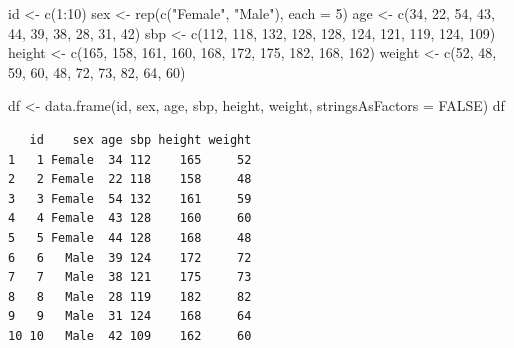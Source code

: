 \documentclass[
  11pt,
]{krantz}
\newenvironment{Shaded}{\begin{snugshade}}{\end{snugshade}}
\newcommand{\AttributeTok}[1]{\textcolor[rgb]{0.61,0.61,0.61}{#1}}
\newcommand{\ConstantTok}[1]{\textcolor[rgb]{0,0,0}{#1}}
\newcommand{\DecValTok}[1]{\textcolor[rgb]{0.06,0.06,0.06}{#1}}
\newcommand{\FunctionTok}[1]{\textcolor[rgb]{0,0,0}{#1}}
\newcommand{\NormalTok}[1]{#1}
\newcommand{\OtherTok}[1]{\textcolor[rgb]{0.37,0.37,0.37}{#1}}
\newcommand{\SpecialCharTok}[1]{\textcolor[rgb]{0,0,0}{#1}}
\newcommand{\StringTok}[1]{\textcolor[rgb]{0.5,0.5,0.5}{#1}}
\begin{document}
\begin{Shaded}
\begin{Highlighting}[]
\NormalTok{id }\OtherTok{\textless{}{-}} \FunctionTok{c}\NormalTok{(}\DecValTok{1}\SpecialCharTok{:}\DecValTok{10}\NormalTok{)}
\NormalTok{sex }\OtherTok{\textless{}{-}} \FunctionTok{rep}\NormalTok{(}\FunctionTok{c}\NormalTok{(}\StringTok{"Female"}\NormalTok{, }\StringTok{"Male"}\NormalTok{), }\AttributeTok{each =} \DecValTok{5}\NormalTok{)}
\NormalTok{age }\OtherTok{\textless{}{-}} \FunctionTok{c}\NormalTok{(}\DecValTok{34}\NormalTok{, }\DecValTok{22}\NormalTok{, }\DecValTok{54}\NormalTok{, }\DecValTok{43}\NormalTok{, }\DecValTok{44}\NormalTok{, }\DecValTok{39}\NormalTok{, }\DecValTok{38}\NormalTok{, }\DecValTok{28}\NormalTok{, }\DecValTok{31}\NormalTok{, }\DecValTok{42}\NormalTok{)}
\NormalTok{sbp }\OtherTok{\textless{}{-}} \FunctionTok{c}\NormalTok{(}\DecValTok{112}\NormalTok{, }\DecValTok{118}\NormalTok{, }\DecValTok{132}\NormalTok{, }\DecValTok{128}\NormalTok{, }\DecValTok{128}\NormalTok{, }\DecValTok{124}\NormalTok{, }\DecValTok{121}\NormalTok{, }\DecValTok{119}\NormalTok{, }\DecValTok{124}\NormalTok{, }\DecValTok{109}\NormalTok{)}
\NormalTok{height }\OtherTok{\textless{}{-}} \FunctionTok{c}\NormalTok{(}\DecValTok{165}\NormalTok{, }\DecValTok{158}\NormalTok{, }\DecValTok{161}\NormalTok{, }\DecValTok{160}\NormalTok{, }\DecValTok{168}\NormalTok{, }\DecValTok{172}\NormalTok{, }\DecValTok{175}\NormalTok{, }\DecValTok{182}\NormalTok{, }\DecValTok{168}\NormalTok{, }\DecValTok{162}\NormalTok{)}
\NormalTok{weight }\OtherTok{\textless{}{-}} \FunctionTok{c}\NormalTok{(}\DecValTok{52}\NormalTok{, }\DecValTok{48}\NormalTok{, }\DecValTok{59}\NormalTok{, }\DecValTok{60}\NormalTok{, }\DecValTok{48}\NormalTok{, }\DecValTok{72}\NormalTok{, }\DecValTok{73}\NormalTok{, }\DecValTok{82}\NormalTok{, }\DecValTok{64}\NormalTok{, }\DecValTok{60}\NormalTok{)}

\NormalTok{df }\OtherTok{\textless{}{-}} \FunctionTok{data.frame}\NormalTok{(id, sex, age, sbp, height, weight, }
                 \AttributeTok{stringsAsFactors =} \ConstantTok{FALSE}\NormalTok{)}
\NormalTok{df}
\end{Highlighting}
\end{Shaded}

\begin{verbatim}
   id    sex age sbp height weight
1   1 Female  34 112    165     52
2   2 Female  22 118    158     48
3   3 Female  54 132    161     59
4   4 Female  43 128    160     60
5   5 Female  44 128    168     48
6   6   Male  39 124    172     72
7   7   Male  38 121    175     73
8   8   Male  28 119    182     82
9   9   Male  31 124    168     64
10 10   Male  42 109    162     60
\end{verbatim}
\end{document}
